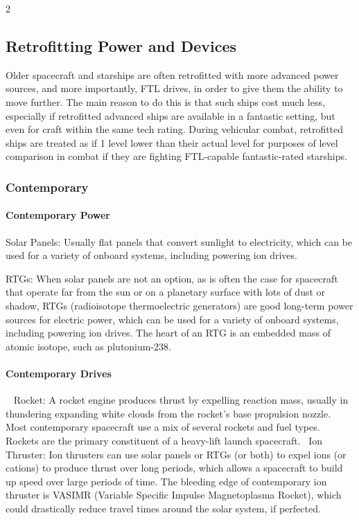 \begin{multicols}{2}

\subsection{Retrofitting Power and Devices}

Older spacecraft and starships are often retrofitted with more advanced power sources, and more importantly, FTL drives, in order to give them the ability to move further. The main reason to do this is that such ships cost much less, especially if retrofitted advanced ships are available in a fantastic setting, but even for craft within the same tech rating. During vehicular combat, retrofitted ships are treated as if 1 level lower than their actual level for purposes of level comparison in combat if they are fighting FTL-capable fantastic-rated starships.

\subsubsection{Contemporary}

\paragraph{Contemporary Power}

Solar Panels: Usually flat panels that convert sunlight to electricity, which can be used for a variety of onboard systems, including powering ion drives. 

RTGs: When solar panels are not an option, as is often the case for spacecraft that operate far from the sun or on a planetary surface with lots of dust or shadow, RTGs (radioisotope thermoelectric generators) are good long-term power sources for electric power, which can be used for a variety of onboard systems, including powering ion drives. The heart of an RTG is an embedded mass of atomic isotope, such as plutonium-238. 

\paragraph{Contemporary Drives}
 
Rocket: A rocket engine produces thrust by expelling reaction mass, usually in thundering expanding white clouds from the rocket’s base propulsion nozzle. Most contemporary spacecraft use a mix of several rockets and fuel types. Rockets are the primary constituent of a heavy-lift launch spacecraft. 
Ion Thruster: Ion thrusters can use solar panels or RTGs (or both) to expel ions (or cations) to produce thrust over long periods, which allows a spacecraft to build up speed over large periods of time. The bleeding edge of contemporary ion thruster is VASIMR (Variable Specific Impulse Magnetoplasma Rocket), which could drastically reduce travel times around the solar system, if perfected.


\end{multicols}
